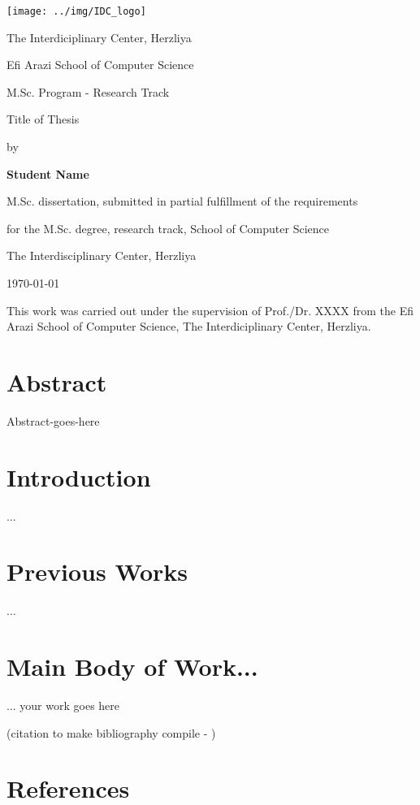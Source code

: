 \documentclass[12pt]{article}
\begin{document}
\begin{titlepage}
	\centering
	\texttt{[image: ../img/IDC\_logo]}\par\vspace{2cm}
	{\huge The Interdiciplinary Center, Herzliya \par}
	{\Large Efi Arazi School of Computer Science \par}
	{\Large M.Sc. Program - Research Track \par}
	
	\vspace{1cm}
	
	\vspace{1.5cm}
	{\Huge Title of Thesis\par}
	\vspace{3cm}
	{\large by\par}
	{\large\bfseries Student Name\par}
	
	\vspace{2cm}
	{M.Sc. dissertation, submitted in partial fulfillment of the requirements\par}
	{for the M.Sc. degree, research track, School of Computer Science\par}
	{The Interdisciplinary Center, Herzliya}
	
	\vfill
	
	{\large \monthyeardate\today \par}
	
\end{titlepage}

\newpage

This work was carried out under the supervision of Prof./Dr. XXXX from the Efi Arazi School of Computer Science, The	Interdiciplinary Center, Herzliya.

\newpage

\section*{Abstract}
Abstract-goes-here	


\newpage

\tableofcontents

\newpage

\section{Introduction}
...

\section{Previous Works}
...

\section{Main Body of Work...}
... your work goes here 

(citation to make bibliography compile - \cite{GUTEETAL09,KAMMETAL17,KAMMETAL18})



\newpage

\section{References}
\renewcommand*{\refname}{ }




\newpage
\end{document}
